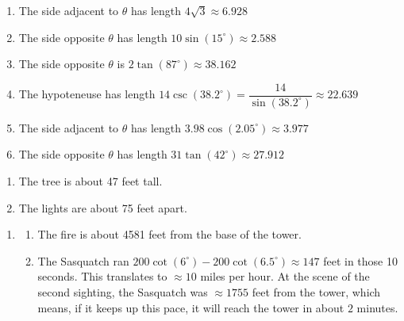 \begin{enumerate}

\setcounter{enumi}{\value{HW}}

\item  The side adjacent to $\theta$ has length $4\sqrt{3} \approx 6.928$

\item  The side opposite $\theta$ has length $10 \sin(15^{\circ}) \approx 2.588$

\item  The side opposite $\theta$ is $2\tan(87^{\circ}) \approx 38.162$

\item  The hypoteneuse has length $14 \csc(38.2^{\circ}) = \dfrac{14}{\sin(38.2^{\circ})} \approx 22.639$

\item  The side adjacent to $\theta$ has length $3.98 \cos(2.05^{\circ}) \approx 3.977$

\item  The side opposite $\theta$ has length $31\tan(42^{\circ}) \approx 27.912$

\setcounter{HW}{\value{enumi}}

\end{enumerate}

\begin{enumerate}

\setcounter{enumi}{\value{HW}}

\item The tree is about 47 feet tall.

\item The lights are about 75 feet apart.

\setcounter{HW}{\value{enumi}}

\end{enumerate}

\begin{enumerate}

\setcounter{enumi}{\value{HW}}

\item \begin{enumerate}

\addtocounter{enumii}{1}

\item The fire is about 4581 feet from the base of the tower.

\item  The Sasquatch ran $200\cot(6^{\circ}) - 200\cot(6.5^{\circ}) \approx 147$ feet in those 10 seconds. This translates to $\approx 10$ miles per hour.  At the scene of the second sighting, the Sasquatch was $\approx 1755$ feet from the tower, which means, if it keeps up this pace, it will reach the tower in about $2$ minutes.

\end{enumerate}

\setcounter{HW}{\value{enumi}}

\end{enumerate}

